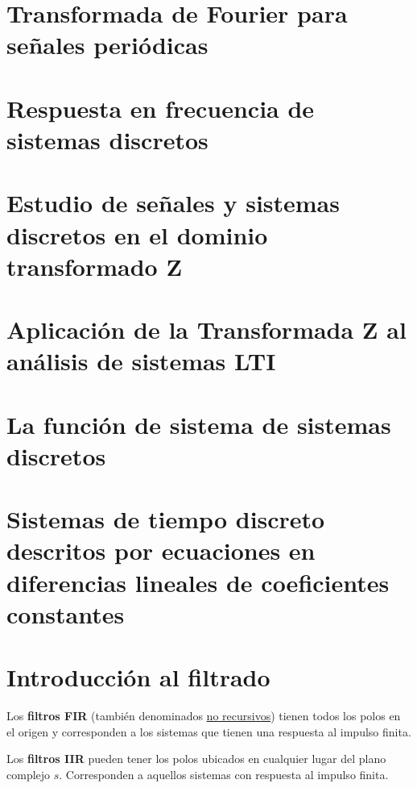 \documentclass[a4paper]{book}
\begin{document}
\section{Transformada de Fourier para señales periódicas}

\section{Respuesta en frecuencia de sistemas discretos}

\section{Estudio de señales y sistemas discretos en el dominio transformado Z}

\section{Aplicación de la Transformada Z al análisis de sistemas LTI}

\section{La función de sistema de sistemas discretos}

\section{Sistemas de tiempo discreto descritos por ecuaciones en diferencias lineales de coeficientes constantes}

\section{Introducción al filtrado}
Los \textbf{filtros FIR} (también denominados \underline{no recursivos}) tienen todos los polos en el origen y corresponden a los sistemas que tienen una respuesta al impulso finita.

Los \textbf{filtros IIR} pueden tener los polos ubicados en cualquier lugar del plano complejo $s$. Corresponden a aquellos sistemas con respuesta al impulso finita.

\appendix

\titlespacing*{\chapter}{0pt}{-19pt}{0pt}
\end{document}
